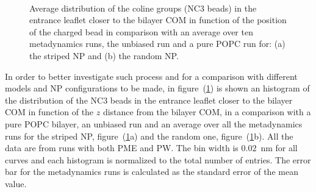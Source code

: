 \begin{figure}[h!p]
	\center
	\\%
	\caption{Average distribution of the coline groups (NC3 beads) in the entrance leaflet closer to the bilayer \acs{COM} in function of the position of the charged bead in comparison with an average over ten metadynamics runs, the unbiased run and a pure \acs{POPC} run for: (a) the striped \acs{NP} and (b) the random \acs{NP}.}
	\label{fig:NC3minDist}
\end{figure}

In order to better investigate such process and for a comparison with different models and \ac{NP} configurations to be made, in figure~(\ref{fig:NC3minDist}) is shown an histogram of the distribution of the NC$3$ beads in the entrance leaflet closer to the bilayer \ac{COM} in function of the $z$ distance from the bilayer \ac{COM}, in a comparison with a pure \ac{POPC} bilayer, an unbiased run and an average over all the metadynamics runs for the striped \ac{NP}, figure~(\ref{fig:NC3minDist}a) and the random one, figure~(\ref{fig:NC3minDist}b). All the data are from runs with both \ac{PME} and \ac{PW}. The bin width is $0.02$~nm for all curves and each histogram is normalized to the total number of entries. The error bar for the metadynamics runs is calculated as the standard error of the mean value.

